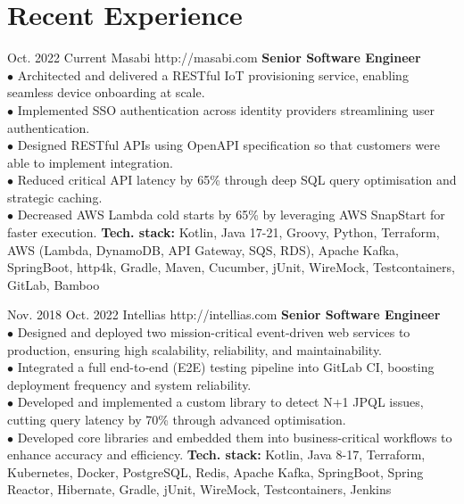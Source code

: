 \documentclass[10pt]{article} %
\begin{document}
\section{Recent Experience}
\job
{Oct. 2022 }{ Current}
{Masabi}
{http://masabi.com}
{\textbf{Senior Software Engineer}}
{
\textbf{}   
\\$\bullet$ Architected and delivered a RESTful IoT provisioning service, enabling seamless device onboarding at scale.
\\$\bullet$ Implemented SSO authentication across identity providers streamlining user authentication.
\\$\bullet$ Designed RESTful APIs using OpenAPI specification so that customers were able to implement integration.
\\$\bullet$ Reduced critical API latency by 65\% through deep SQL query optimisation and strategic caching.
\\$\bullet$ Decreased AWS Lambda cold starts by 65\% by leveraging AWS SnapStart for faster execution.
\vadjust{\vspace{4pt}}
\newline
\textbf{Tech. stack: }{Kotlin, Java 17-21, Groovy, Python, Terraform, AWS (Lambda, DynamoDB, API Gateway, SQS, RDS), Apache Kafka, SpringBoot, http4k, Gradle, Maven, Cucumber, jUnit, WireMock, Testcontainers, GitLab, Bamboo}   
 }
 
 \job
{Nov. 2018 }{ Oct. 2022}
{Intellias}
{http://intellias.com}
{\textbf{Senior Software Engineer}}
{
\textbf{}   
\\$\bullet$ Designed and deployed two mission-critical event-driven web services to production, ensuring high scalability, reliability, and maintainability.
\\$\bullet$ Integrated a full end-to-end (E2E) testing pipeline into GitLab CI, boosting deployment frequency and system reliability.
\\$\bullet$ Developed and implemented a custom library to detect N+1 JPQL issues, cutting query latency by 70\% through advanced optimisation.
\\$\bullet$ Developed core libraries and embedded them into business-critical workflows to enhance accuracy and efficiency.
\vadjust{\vspace{4pt}}
\newline
\textbf{Tech. stack: }{Kotlin, Java 8-17, Terraform, Kubernetes, Docker, PostgreSQL, Redis, Apache Kafka, SpringBoot, Spring Reactor, Hibernate, Gradle, jUnit, WireMock, Testcontainers, Jenkins}   
 }
\end{document}
